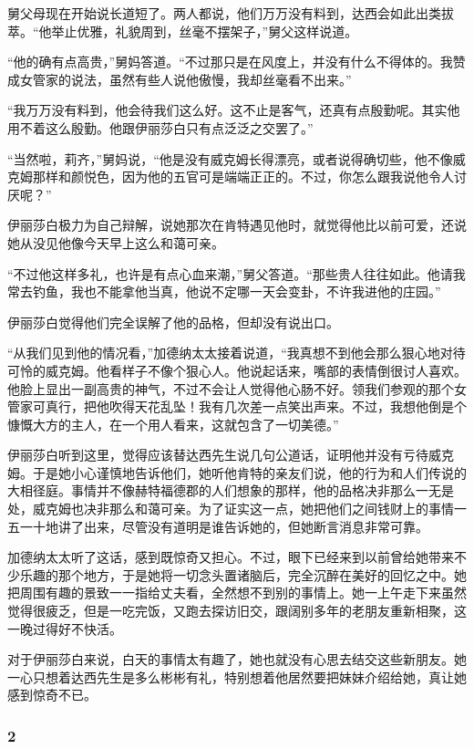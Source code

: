 \par 舅父母现在开始说长道短了。两人都说，他们万万没有料到，达西会如此出类拔萃。“他举止优雅，礼貌周到，丝毫不摆架子，”舅父这样说道。
\par “他的确有点高贵，”舅妈答道。“不过那只是在风度上，并没有什么不得体的。我赞成女管家的说法，虽然有些人说他傲慢，我却丝毫看不出来。”
\par “我万万没有料到，他会待我们这么好。这不止是客气，还真有点殷勤呢。其实他用不着这么殷勤。他跟伊丽莎白只有点泛泛之交罢了。”
\par “当然啦，莉齐，”舅妈说，“他是没有威克姆长得漂亮，或者说得确切些，他不像威克姆那样和颜悦色，因为他的五官可是端端正正的。不过，你怎么跟我说他令人讨厌呢？”
\par 伊丽莎白极力为自己辩解，说她那次在肯特遇见他时，就觉得他比以前可爱，还说她从没见他像今天早上这么和蔼可亲。
\par “不过他这样多礼，也许是有点心血来潮，”舅父答道。“那些贵人往往如此。他请我常去钓鱼，我也不能拿他当真，他说不定哪一天会变卦，不许我进他的庄园。”
\par 伊丽莎白觉得他们完全误解了他的品格，但却没有说出口。
\par “从我们见到他的情况看，”加德纳太太接着说道，“我真想不到他会那么狠心地对待可怜的威克姆。他看样子不像个狠心人。他说起话来，嘴部的表情倒很讨人喜欢。他脸上显出一副高贵的神气，不过不会让人觉得他心肠不好。领我们参观的那个女管家可真行，把他吹得天花乱坠！我有几次差一点笑出声来。不过，我想他倒是个慷慨大方的主人，在一个用人看来，这就包含了一切美德。”
\par 伊丽莎白听到这里，觉得应该替达西先生说几句公道话，证明他并没有亏待威克姆。于是她小心谨慎地告诉他们，她听他肯特的亲友们说，他的行为和人们传说的大相径庭。事情并不像赫特福德郡的人们想象的那样，他的品格决非那么一无是处，威克姆也决非那么和蔼可亲。为了证实这一点，她把他们之间钱财上的事情一五一十地讲了出来，尽管没有道明是谁告诉她的，但她断言消息非常可靠。
\par 加德纳太太听了这话，感到既惊奇又担心。不过，眼下已经来到以前曾给她带来不少乐趣的那个地方，于是她将一切念头置诸脑后，完全沉醉在美好的回忆之中。她把周围有趣的景致一一指给丈夫看，全然想不到别的事情上。她一上午走下来虽然觉得很疲乏，但是一吃完饭，又跑去探访旧交，跟阔别多年的老朋友重新相聚，这一晚过得好不快活。
\par 对于伊丽莎白来说，白天的事情太有趣了，她也就没有心思去结交这些新朋友。她一心只想着达西先生是多么彬彬有礼，特别想着他居然要把妹妹介绍给她，真让她感到惊奇不已。



\subsubsection*{2}


